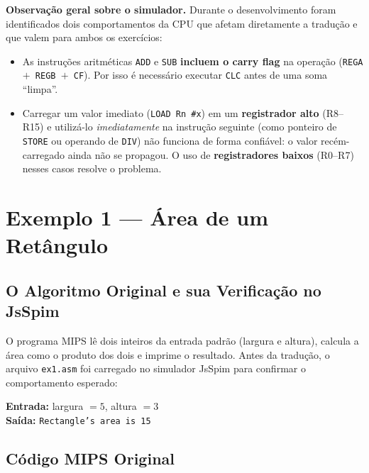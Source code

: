 \documentclass[12pt, a4paper]{article}
\begin{document}
\begin{destaque}
\textbf{Observação geral sobre o simulador.} Durante o desenvolvimento foram identificados dois comportamentos da CPU que afetam diretamente a tradução e que valem para ambos os exercícios:
\begin{itemize}[itemsep=3pt]
  \item As instruções aritméticas \texttt{ADD} e \texttt{SUB} \textbf{incluem o carry flag} na operação (\texttt{REGA $+$ REGB $+$ CF}). Por isso é necessário executar \texttt{CLC} antes de uma soma ``limpa''.
  \item Carregar um valor imediato (\texttt{LOAD Rn \#x}) em um \textbf{registrador alto} (R8--R15) e utilizá-lo \emph{imediatamente} na instrução seguinte (como ponteiro de \texttt{STORE} ou operando de \texttt{DIV}) não funciona de forma confiável: o valor recém-carregado ainda não se propagou. O uso de \textbf{registradores baixos} (R0--R7) nesses casos resolve o problema.
\end{itemize}
\end{destaque}

\section{Exemplo 1 --- Área de um Retângulo}

\subsection{O Algoritmo Original e sua Verificação no JsSpim}

O programa MIPS lê dois inteiros da entrada padrão (largura e altura), calcula a área como o produto dos dois e imprime o resultado. Antes da tradução, o arquivo \texttt{ex1.asm} foi carregado no simulador JsSpim para confirmar o comportamento esperado:

\begin{destaque}
  \textbf{Entrada:} \quad largura $= 5$, \quad altura $= 3$ \\[4pt]
  \textbf{Saída:} \quad \texttt{Rectangle's area is 15}
\end{destaque}

\subsection{Código MIPS Original}
\end{document}
